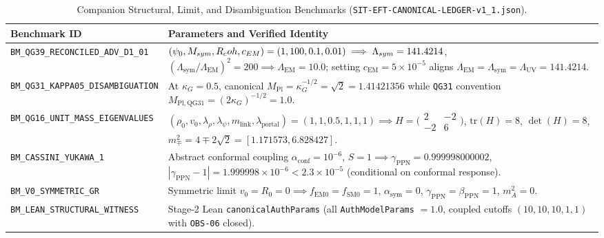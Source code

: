 \begin{table}[htbp]
\centering
\caption{Companion Structural, Limit, and Disambiguation Benchmarks (\texttt{SIT-EFT-CANONICAL-LEDGER-v1\_\allowbreak{}1.\allowbreak{}json}).}
\label{tab:six-companion-benchmarks}
\vspace{0.4em}
\small
\begin{tabular}{|p{4.6cm}|p{9.8cm}|}
\hline
\textbf{Benchmark ID} & \textbf{Parameters and Verified Identity} \\
\hline
\texttt{BM\_\allowbreak{}QG39\_\allowbreak{}RECONCILED\_\allowbreak{}ADV\_\allowbreak{}D1\_\allowbreak{}01} & $(\psi_0, M_{sym}, R_coh, c_{EM}) = (1, 100, 0.1, 0.01) \implies \Lambda_{sym} = 141.4214$, $(\Lambda_{\mathrm{sym}}/\Lambda_{\mathrm{EM}})^2 = 200 \implies \Lambda_{\mathrm{EM}} = 10.0$; setting $c_{\mathrm{EM}} = 5\times 10^{-5}$ aligns $\Lambda_{\mathrm{EM}} = \Lambda_{\mathrm{sym}} = \Lambda_{\mathrm{UV}} = 141.4214$. \\
\hline
\texttt{BM\_\allowbreak{}QG31\_\allowbreak{}KAPPA05\_\allowbreak{}DISAMBIGUATION} & At $\kappa_G = 0.5$, canonical $M_{\mathrm{Pl}} = \kappa_G^{-1/2} = \sqrt{2} = 1.41421356$ while \texttt{QG31} convention $M_{\mathrm{Pl,QG31}} = (2\kappa_G)^{-1/2} = 1.0$. \\
\hline
\texttt{BM\_\allowbreak{}QG16\_\allowbreak{}UNIT\_\allowbreak{}MASS\_\allowbreak{}EIGENVALUES} & $(\rho_0,v_0,\lambda_\rho,\lambda_\psi,m_{\mathrm{link}},\lambda_{\mathrm{portal}}) = (1,1,0.5,1,1,1) \implies H = \bigl(\begin{smallmatrix}2 & -2\\ -2 & 6\end{smallmatrix}\bigr)$, $\mathrm{tr}(H)=8$, $\det(H)=8$, $m_\mp^2 = 4 \mp 2\sqrt{2} = [1.171573, 6.828427]$. \\
\hline
\texttt{BM\_\allowbreak{}CASSINI\_\allowbreak{}YUKAWA\_\allowbreak{}1} & Abstract conformal coupling $\alpha_{\mathrm{conf}} = 10^{-6}$, $S = 1 \implies \gamma_{\mathrm{PPN}} = 0.999998000002$, $|\gamma_{\mathrm{PPN}}-1| = 1.999998\times 10^{-6} < 2.3\times 10^{-5}$ (conditional on conformal response). \\
\hline
\texttt{BM\_V0\_SYMMETRIC\_GR} & Symmetric limit $v_0 = R_0 = 0 \implies f_{\mathrm{EM}0} = f_{\mathrm{SM}0} = 1$, $\alpha_{\mathrm{sym}} = 0$, $\gamma_{\mathrm{PPN}} = \beta_{\mathrm{PPN}} = 1$, $m_A^2 = 0$. \\
\hline
\texttt{BM\_\allowbreak{}LEAN\_\allowbreak{}STRUCTURAL\_\allowbreak{}WITNESS} & Stage-2 Lean \texttt{canonicalAuthParams} (all \texttt{AuthModelParams} $= 1.0$, coupled cutoffs $(10,10,10,1,1)$ with \texttt{OBS-06} closed). \\
\hline
\end{tabular}
\end{table}

